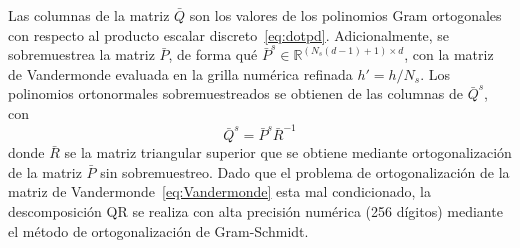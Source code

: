 Las columnas de la matriz $\bar{Q}$ son los valores de los polinomios Gram ortogonales 
con respecto al producto escalar discreto~\eqref{eq:dotpd}.
Adicionalmente, se sobremuestrea la matriz $\bar{P}$, de forma qué 
$\bar{P}^s \in \mathbb{R}^{(N_s(d-1)+1)\times d}$, 
con la matriz de Vandermonde evaluada en la grilla numérica refinada $h'=h/N_s$. 
Los polinomios 
ortonormales sobremuestreados se obtienen de las columnas de $\bar{Q}^s$, con 
\begin{equation}
\bar{Q}^s=\bar{P}^s \bar{R}^{-1}
\label{eq:qsob}
\end{equation}
donde $\bar{R}$ se la matriz triangular superior que se obtiene 
mediante ortogonalización de la matriz $\bar{P}$ sin sobremuestreo. Dado 
que el problema de ortogonalización de la matriz de Vandermonde~\eqref{eq:Vandermonde} 
esta mal condicionado, la descomposición QR se realiza con alta precisión 
numérica (256 dígitos) mediante el método de ortogonalización de Gram-Schmidt.

